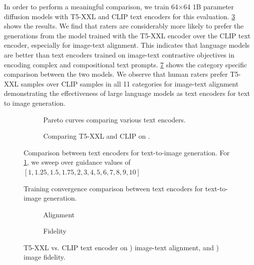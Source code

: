 In order to perform a meaningful comparison, we train 64$\times$64 1B parameter diffusion models with T5-XXL and CLIP text encoders for this evaluation. \cref{fig:drawit_t5_vs_clip} shows the results. We find that raters are considerably more likely to prefer the generations from the model trained with the T5-XXL encoder over the CLIP text encoder, especially for image-text alignment. This indicates that language models are better than text encoders trained on image-text contrastive objectives in encoding complex and compositional text prompts. 
\cref{fig:t5xx_vs_clip_drawbench_details} shows the category specific comparison between the two models. We observe that human raters prefer T5-XXL samples over CLIP samples in all 11 categories for image-text alignment  demonstrating the effectiveness of large language models as text encoders for text to image generation.  

\begin{figure}[t]
    \centering
    \begin{subfigure}[t]{0.49\textwidth}
    
    \caption{Pareto curves comparing various text encoders.}
     \label{fig:embedding_comparison_pareto}
    \end{subfigure}\hfill
    \begin{subfigure}[t]{0.49\textwidth}
     \centering
     
      \caption{Comparing T5-XXL and CLIP on \benchmarkname.}
      \label{fig:drawit_t5_vs_clip}
    \end{subfigure}
    \caption{Comparison between text encoders for text-to-image generation. For \cref{fig:embedding_comparison_pareto}, we sweep over guidance values of $[1, 1.25, 1.5, 1.75, 2, 3, 4, 5, 6, 7, 8, 9, 10]$}
\end{figure}

\begin{figure}[t]
    \centering
    
    \caption{Training convergence comparison between text encoders for text-to-image generation.}
    \label{Fig:EmbeddingTrainingCurves}
\end{figure}


\begin{figure}
    \centering
    \begin{subfigure}[t]{\textwidth}
    
    \caption{Alignment}
    \label{fig:t5xxl_vs_clip_detailed_alignment_alignment}
    \vspace*{0.5cm}
    \end{subfigure}
    \begin{subfigure}[t]{\textwidth}
    
    \caption{Fidelity}
    \label{fig:t5xxl_vs_clip_detailed_alignment_fidelity}
    \end{subfigure}
    \caption{T5-XXL vs. CLIP text encoder on \benchmarkname {}) image-text alignment, and ) image fidelity.}
    \label{fig:t5xx_vs_clip_drawbench_details}
\end{figure}

